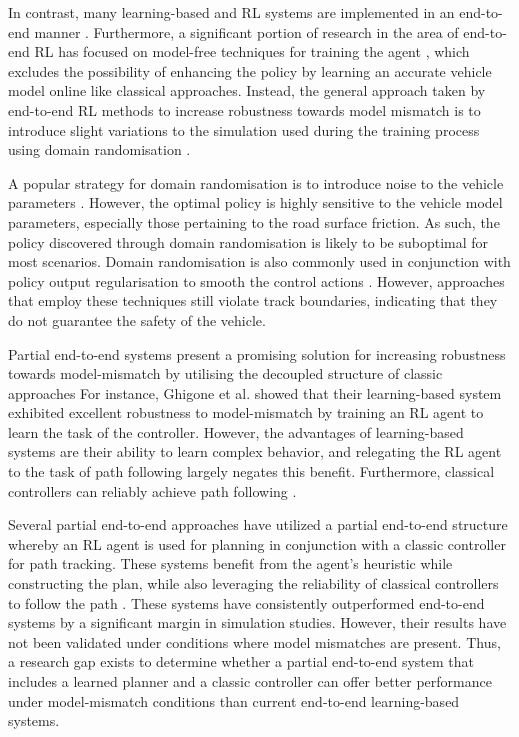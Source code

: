 In contrast, many learning-based and RL systems are implemented in an end-to-end manner \cite{Song2021, Fuchs2021}.
Furthermore, a significant portion of research in the area of end-to-end RL has focused on model-free techniques for training the agent \cite{hsu2022, Chisari2021}, 
which excludes the possibility of enhancing the policy by learning an accurate vehicle model online like classical approaches.
Instead, the general approach taken by end-to-end RL methods to increase robustness towards model mismatch is to 
introduce slight variations to the simulation used during the training process using domain randomisation \cite{Ivanov2020, hsu2022, Chisari2021}.

A popular strategy for domain randomisation is to introduce noise to the vehicle parameters \cite{Chisari2021}. 
However, the optimal policy is highly sensitive to the vehicle model parameters, especially those pertaining to the road surface friction. 
As such, the policy discovered through domain randomisation is likely to be suboptimal for most scenarios.
Domain randomisation is also commonly used in conjunction with policy output regularisation to smooth the control actions \cite{hsu2022, Chisari2021}.
However, approaches that employ these techniques \cite{Ivanov2020, hsu2022, Chisari2021} still violate track boundaries, indicating that they do not guarantee the safety of the vehicle.

Partial end-to-end systems present a promising solution for increasing robustness towards model-mismatch by utilising the decoupled structure of classic approaches
For instance, Ghigone et al. \cite{Ghignone2022} showed that their learning-based system exhibited excellent robustness to model-mismatch by training an RL agent to learn the task of the controller. 
However, the advantages of learning-based systems are their ability to learn complex behavior, and relegating the RL agent to the task of path following largely negates this benefit. 
Furthermore, classical controllers can reliably achieve path following \cite{Coulter_1992, Becker2022, Hoffmann2007}.

Several partial end-to-end approaches \cite{Capo2020, Weiss2020, Weiss2020a, Weiss2022} have utilized a partial end-to-end structure whereby an RL agent is used for planning in conjunction with a classic controller for path tracking. 
These systems benefit from the agent's heuristic while constructing the plan, while also leveraging the reliability of classical controllers to follow the path \cite{Betz2021}.
These systems have consistently outperformed end-to-end systems by a significant margin in simulation studies. 
However, their results have not been validated under conditions where model mismatches are present. 
Thus, a research gap exists to determine whether a partial end-to-end system that includes a learned planner and a classic controller can offer better performance under model-mismatch conditions than current end-to-end learning-based systems.

